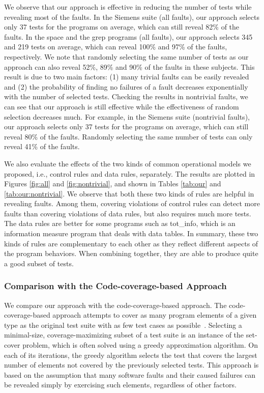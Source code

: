 \documentclass{sig-alternate}
\begin{document}
We observe that our approach is effective in reducing the number of
tests while revealing most of the faults. In the Siemens suite (all
faults), our approach selects only 37 tests for the programs on
average, which can still reveal 82\% of the faults. In the space and
the grep programs (all faults), our approach selects 345 and 219
tests on average, which can reveal 100\% and 97\% of the faults,
respectively. We note that randomly selecting the same number of
tests as our approach can also reveal 52\%, 89\% and 90\% of the
faults in these subjects. This result is due to two main factors:
(1) many trivial faults can be easily revealed and (2) the
probability of finding no failures of a fault decreases
exponentially with the number of selected tests. Checking the
results in nontrivial faults, we can see that our approach is still
effective while the effectiveness of random selection decreases
much. For example, in the Siemens suite (nontrivial faults), our
approach selects only 37 tests for the programs on average, which
can still reveal 80\% of the faults. Randomly selecting the same
number of tests can only reveal 41\% of the faults.

We also evaluate the effects of the two kinds of common operational
models we proposed, i.e., control rules and data rules, separately.
The results are plotted in Figures \ref{fig:all} and
\ref{fig:nontrivial}, and shown in Tables \ref{tab:our} and
\ref{tab:our:nontrivial}. We observe that both these two kinds of
rules are helpful in revealing faults. Among them, covering
violations of control rules can detect more faults than covering
violations of data rules, but also requires much more tests. The
data rules are better for some programs such as tot\_info, which is
an information measure program that deals with data tables. In
summary, these two kinds of rules are complementary to each other as
they reflect different aspects of the program behaviors. When
combining together, they are able to produce quite a good subset of
tests.




\subsubsection{Comparison with the Code-coverage-based Approach}

We compare our approach with the code-coverage-based approach. The
code-coverage-based approach attempts to cover as many program
elements of a given type as the original test suite with as few test
cases as possible~\cite{Leon05}. Selecting a minimal-size,
coverage-maximizing subset of a test suite is an instance of the
set-cover problem, which is often solved using a greedy
approximation algorithm. On each of its iterations, the greedy
algorithm selects the test that covers the largest number of
elements not covered by the previously selected tests. This approach
is based on the assumption that many software faults and their
caused failures can be revealed simply by exercising such elements,
regardless of other factors.
\end{document}

